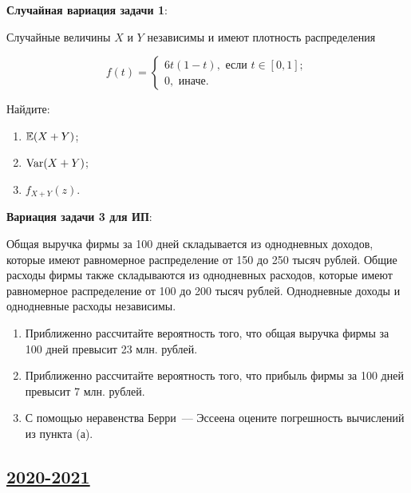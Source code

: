 \textbf{Случайная вариация задачи 1}:

Случайные величины $X$ и $Y$ независимы и имеют плотность распределения

\[
f(t) = 
\begin{cases}
6 t (1-t), \text{ если } t \in [0,1]; \\
0, \text{ иначе.}
\end{cases}
\]

Найдите:

\begin{enumerate}
    \item $\operatorname{\mathbb{E}}(X+Y)$;
    \item $\operatorname{Var}(X+Y)$;
    \item $f_{X+Y}(z)$.
\end{enumerate}


\textbf{Вариация задачи 3 для ИП}:

Общая выручка фирмы за 100 дней складывается из однодневных доходов, которые имеют равномерное распределение от 150 до 250 тысяч рублей. 
Общие расходы фирмы также складываются из однодневных расходов, которые имеют равномерное распределение от 100 до 200 тысяч рублей. 
Однодневные доходы и однодневные расходы независимы.

\begin{enumerate}
    \item Приближенно рассчитайте вероятность того, что общая выручка фирмы за 100 дней превысит 23 млн. рублей.
    \item Приближенно рассчитайте вероятность того, что прибыль фирмы за 100 дней превысит 7 млн. рублей.
    \item С помощью неравенства Берри~— Эссеена оцените погрешность вычислений из пункта (а). 
\end{enumerate}





\subsection[2020-2021]{\hyperref[sec:sol_kr_02_2020_2021]{2020-2021}}
\label{sec:kr_02_2020_2021}



